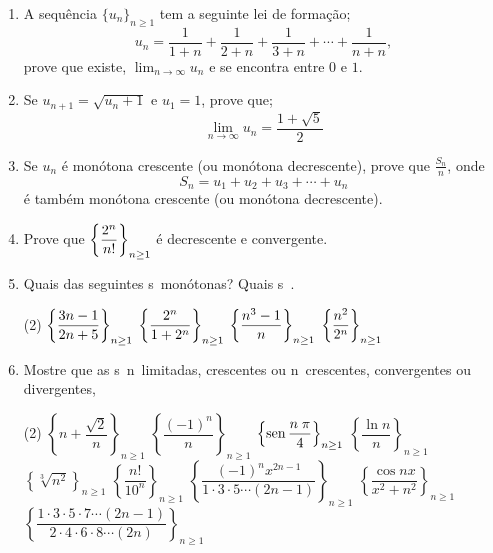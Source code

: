 \begin{enumerate}[label=\rm{(\arabic*)},ref=\rm{(\arabic*)}]
\item A sequ\^encia $\{u_n\}_{n\geq 1}$ tem a seguinte lei de forma\c c\~ao;
\begin{equation*}
u_n=\frac{1}{1+n}+\frac{1}{2+n}+\frac{1}{3+n}+\cdots+\frac{1}{n+n},
\end{equation*}
prove que existe, $\displaystyle{\lim_{n\to\infty}u_n}$\; e se
encontra entre $0$ e $1$.

\item Se $u_{n+1}=\sqrt{u_n+1}$\; e $u_1=1$, prove que;
$$\lim_{n\to\infty}u_n=\frac{1+\sqrt{5}}{2}$$

\item Se $u_n$ \'e mon\'otona crescente (ou mon\'otona decrescente),
prove que $\displaystyle{\frac{S_n}{n}}$, onde $$
S_n=u_1+u_2+u_3+\cdots+u_n $$ \'e tamb\'em mon\'otona crescente
(ou mon\'otona decrescente).

\item Prove que $\displaystyle{\left\{\frac{2^n}{n!}\right\}_{n\geq 1}}$ \'e decrescente e convergente.
\item Quais das seguintes \seqs s\ao\ mon\'{o}tonas? Quais s\ao\
\convs.
\begin{tasks}[label=\rm{(\alph*)},item-indent=4em,label-width=4ex,ref=\rm{(\alph*)}](2)
\task \(\displaystyle{\left\{\frac{3n-1}{2n+5}\right\}_{n\geq 1}}\)
\task \(\displaystyle{\left\{\frac{2^n}{1+2^n}\right\}_{n\geq 1}}\)
\task  \(\displaystyle{\left\{\frac{n^3-1}{n}\right\}_{n\geq 1}}\)
\task \(\displaystyle{\left\{\frac{n^2}{2^n}\right\}_{n\geq 1}}\)
\end{tasks}

\item Mostre que as \seqs s\ao\ n\ao\ limitadas,  crescentes ou n\ao\ crescentes, convergentes ou divergentes,
\begin{tasks}[label=\rm{(\alph*)},item-indent=4em,label-width=4ex,ref=\rm{(\alph*)}](2)
\task \(\left\{\displaystyle{n+\dfrac{\sqrt{2}}{n}}\right\}_{n\geq 1}\)
\task \(\left\{\displaystyle{\dfrac{(-1)^{n}}{n}} \right\}_{n\geq 1}\)
\task \(\left\{\displaystyle{\operatorname{sen}\frac{n\;\pi}{4}}\right\}_{n\geq 1}\)
\task \(\left\{\displaystyle{\dfrac{\ln n}{n}}\right\} _{n\geq 1}\)
\task \(\left\{\displaystyle{\sqrt[3]{n^2}}\right\}_{n\geq 1}\)
\task \(\left\{\displaystyle{\dfrac{n!}{10^n}}\right\}_{n\geq 1}\)
\task \(\left\{\displaystyle{\dfrac{(-1)^{n}x^{2n-1}}{1\cdot3\cdot5 \cdots(2n-1)}}\right\} _{n\geq 1}\)
\task \(\left\{\displaystyle{\dfrac{\cos nx}{x^2+n^2}}\right\}_{n\geq 1}\)
\task \(\left\{\displaystyle{\dfrac{1\cdot3\cdot5\cdot7\cdots(2n-1)}{2\cdot4\cdot6\cdot8\cdots(2n)}}\right\}_{n\geq 1}\)
\end{tasks}


\end{enumerate}
